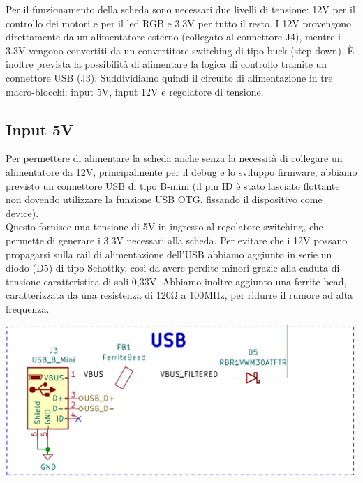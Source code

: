 \noindent Per il funzionamento della scheda sono necessari due livelli di tensione: 
12V per il controllo dei motori e per il led RGB e 3.3V per tutto il resto. 
I 12V provengono direttamente da un alimentatore esterno (collegato al connettore J4), 
mentre i 3.3V vengono convertiti da un convertitore switching di tipo buck (step-down). 
È inoltre prevista la possibilità di alimentare la logica di controllo tramite un connettore USB (J3). 
Suddividiamo quindi il circuito di alimentazione in tre macro-blocchi: input 5V, input 12V e regolatore di tensione.

\hypertarget{input-5V}{
\subsection{\texorpdfstring{Input 5V}{Input 5V}}\label{input-5V}}

Per permettere di alimentare la scheda anche senza la necessità di collegare un 
alimentatore da 12V, principalmente per il debug e lo sviluppo firmware, abbiamo 
previsto un connettore USB di tipo B-mini (il pin ID è stato lasciato flottante non 
dovendo utilizzare la funzione USB OTG, fissando il dispositivo come device).\\
Questo fornisce una tensione di 5V in ingresso al regolatore switching, che permette di generare i 3.3V 
necessari alla scheda. Per evitare che i 12V possano propagarsi sulla rail di alimentazione dell’USB abbiamo 
aggiunto in serie un diodo (D5) di tipo Schottky, così da avere perdite minori grazie alla caduta di tensione 
caratteristica di soli 0,33V.
Abbiamo inoltre aggiunto una ferrite bead, caratterizzata da una resistenza di 120Ω a 100MHz, per
ridurre il rumore ad alta frequenza.

\begin{center}
\includegraphics[scale=0.4]{figures/image60.png}
\captionsetup{type=figure}
\end{center}

